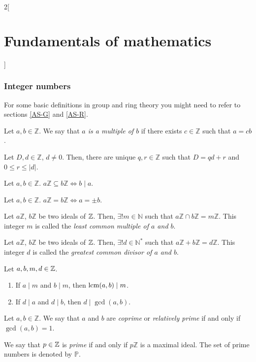 \documentclass[../../../main.tex]{subfiles}
\begin{document}
\begin{multicols}{2}[\section{Fundamentals of mathematics}]
\subsubsection*{Integer numbers}
For some basic definitions in group and ring theory you might need to refer to sections \ref{AS-G} and \ref{AS-R}.
\begin{definition}
    Let $a,b\in\mathbb{Z}$. We say that \textit{$a$ is a multiple of $b$} if there exists $c\in\mathbb{Z}$ such that $a=cb$.
\end{definition}
\begin{theorem}
    Let $D,d\in\mathbb{Z}$, $d\ne 0$. Then, there are unique $q,r\in\mathbb{Z}$ such that $D=qd+r$ and $0\leq r\leq|d|$.
\end{theorem}
\begin{prop}
    Let $a,b\in \mathbb{Z}$. $a\mathbb{Z}\subseteq b\mathbb{Z}\iff b\mid a$.
\end{prop}
\begin{corollary}
    Let $a,b\in \mathbb{Z}$. $a\mathbb{Z}=b\mathbb{Z}\iff a=\pm b$.
\end{corollary}
\begin{prop}
    Let $a\mathbb{Z}$, $b\mathbb{Z}$ be two ideals of $\mathbb{Z}$. Then, $\exists!m\in\mathbb{N}$ such that $a\mathbb{Z}\cap b\mathbb{Z}=m\mathbb{Z}$. This integer $m$ is called the \textit{least common multiple of $a$ and $b$}.
\end{prop}
\begin{prop}
    Let $a\mathbb{Z}$, $b\mathbb{Z}$ be two ideals of $\mathbb{Z}$. Then, $\exists!d\in\mathbb{N}^*$ such that $a\mathbb{Z}+b\mathbb{Z}=d\mathbb{Z}$. This integer $d$ is called the \textit{greatest common divisor of $a$ and $b$}.
\end{prop}
\begin{prop}
    Let $a,b,m,d\in\mathbb{Z}$.
    \begin{enumerate}
        \item If $a\mid m$ and $b\mid m$, then $\operatorname{lcm}(a,b)\mid m$.
        \item If $d\mid a$ and $d\mid b$, then $d\mid\gcd(a,b)$.
    \end{enumerate}
\end{prop}
\begin{definition}
    Let $a,b\in\mathbb{Z}$. We say that $a$ and $b$ are \textit{coprime} or \textit{relatively prime} if and only if $\gcd(a,b)=1$.
\end{definition}
\begin{definition}
    We say that $p\in\mathbb{Z}$ is \textit{prime} if and only if $p\mathbb{Z}$ is a maximal ideal. The set of prime numbers is denoted by $\mathbb{P}$.

\end{definition}
\end{multicols}
\end{document}

